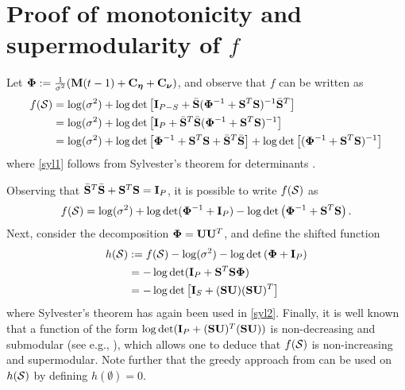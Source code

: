 \documentclass[draftcls,onecolumn,12pt]{IEEEtran}
\def \ceta {{\b{C}_{\bs{\eta}}}}
\def \cnu {{\b{C}_{\bs{\nu}}}}
\def \S {{\c{S}}}
\theoremstyle{plain}\newtheorem{thm}{Theorem}
\theoremstyle{definition}
\theoremstyle{remark}
\begin{document}
\section{Proof of monotonicity and supermodularity of $f$}\label{Asub}
Let $\bs{\Phi} := \frac{1}{\sigma^2}(\b{M}(t-1)+\ceta+\cnu)$, and observe that $f$ can be written as
\begin{subequations}
\begin{align}
f(\S) &= \log(\sigma^2) + \log\det\left[\b{I}_{P-S} + \bar{\b{S}}(\bs{\Phi}^{-1}+\b{S}^T\b{S})^{-1}\bar{\b{S}}^T\right] \\
&= \log(\sigma^2) + \log \det \left[\b{I}_P + \bar{\b{S}}^T\bar{\b{S}}(\bs{\Phi}^{-1}+\b{S}^T\b{S})^{-1}\right] \label{syl1}\\
&= \log(\sigma^2) + \log \det \left[\bs{\Phi}^{-1}+\b{S}^T\b{S} + \bar{\b{S}}^T\bar{\b{S}}\right] + \log\det\left[(\bs{\Phi}^{-1}+\b{S}^T\b{S})^{-1}\right]\label{fs}
\end{align}
\end{subequations}
where \eqref{syl1} follows from Sylvester's theorem for determinants \cite{golub}. 

Observing that $\bar{\mathbf{S}}^T\bar{\mathbf{S}} + \mathbf{S}^T\mathbf{S} = \mathbf{I}_P$, it is possible to write $f(\S)$ as
\begin{align}
f(\S) = \log(\sigma^2) + \log\det(\bs{\Phi}^{-1}+\b{I}_P) - \log\det\left(\bs{\Phi}^{-1} + \b{S}^T\b{S}\right).
\end{align}
Next, consider the decomposition $\boldsymbol{\Phi} = \mathbf{U}\mathbf{U}^T$, and define the shifted function
\begin{subequations}
\begin{align}
h(\S)&:= f(\S) - \log(\sigma^2) - \log\det\left(\bs{\Phi}+\b{I}_P\right) \\
&= -\log\det(\b{I}_P + \b{S}^T\b{S}\bs{\Phi}) \\
&= -\log\det\left[ \b{I}_S + (\b{S}\b{U})(\b{S}\b{U})^T \right] \label{syl2}
\end{align}
\end{subequations}
where Sylvester's theorem has again been used in \eqref{syl2}. 
Finally, it is well known that a function of the form $\log\det(\mathbf{I}_P + (\mathbf{S}\mathbf{U})^T(\mathbf{S}\mathbf{U}))$ is non-decreasing and submodular (see e.g., \cite{bach}), which allows one to deduce that $f(\S)$ is non-increasing and supermodular. Note further that the greedy approach from \cite{nemh} can be used on $h(\S)$ by defining $h(\emptyset)=0$. 


\newpage



\end{document}
